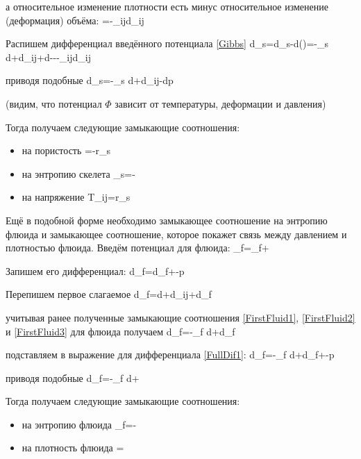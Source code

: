 \documentclass[main.tex]{subfiles}
\begin{document}
а относительное изменение плотности есть минус относительное изменение (деформация) объёма:
\beq
{}=-\delta_{ij}d\varepsilon_{ij}
\eeq

Распишем дифференциал введённого потенциала \eqref{Gibbs}
\beq
d\Phi_s=d\tilde{\Psi}_s-d\left(\right)=-\eta_s d\theta+d\varepsilon_{ij}+d\varphi---\delta_{ij}d\varepsilon_{ij}
\eeq

приводя подобные
\beq
d\Phi_s=-\eta_s d\theta+d\varepsilon_{ij}-dp
\eeq

(видим, что потенциал $\Phi$ зависит от температуры, деформации и давления)

Тогда получаем следующие замыкающие соотношения:

\begin{itemize}
\item на пористость
\beq
\varphi=-r_s
\eeq

\item на энтропию скелета
\beq
\eta_s=-
\eeq

\item на напряжение
\beq
T_{ij}=r_s
\eeq
\end{itemize}

Ещё в подобной форме необходимо замыкающее соотношение на энтропию флюида и замыкающее соотношение, которое покажет связь между давлением и плотностью флюида.
Введём потенциал для флюида:
\beq
\Phi_f=\Psi_f+
\eeq

Запишем его дифференциал:
\beq\label{FullDif1}
d\Phi_f=d\Psi_f+-p
\eeq

Перепишем первое слагаемое
\beq
d\Psi_f=d\theta+d\varepsilon_{ij}+d\rho_f
\eeq

учитывая ранее полученные замыкающие соотношения \eqref{FirstFluid1}, \eqref{FirstFluid2} и \eqref{FirstFluid3} для флюида получаем
\beq
d\Psi_f=-\eta_f d\theta+d\rho_f
\eeq

подставляем в выражение для дифференциала \eqref{FullDif1}:
\beq
d\Phi_f=-\eta_f d\theta+d\rho_f+-p
\eeq

приводя подобные
\beq
d\Phi_f=-\eta_f d\theta+
\eeq

Тогда получаем следующие замыкающие соотношения:

\begin{itemize}
\item на энтропию флюида
\beq
\eta_f=-
\eeq

\item на плотность флюида
\beq
{}=
\eeq
\end{itemize}
\end{document}
